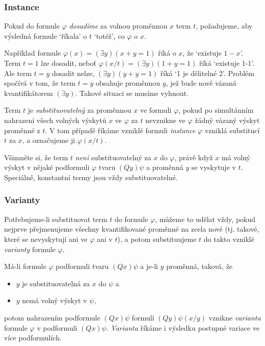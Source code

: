 \subsubsection{Instance}

Pokud do formule $\varphi$ \emph{dosadíme} za volnou proměnnou $x$ term $t$, požadujeme, aby výsledná formule `říkala' o $t$ `totéž', co $\varphi$ o $x$. 

\begin{example}
    Například formule $\varphi(x)=(\exists y)(x+y=1)$ říká o $x$, že `existuje $1-x$'. Term $t=1$ lze dosadit, neboť $\varphi(x/t)=(\exists y)(1+y=1)$ říká `existuje 1-1'. Ale term $t=y$ dosadit nelze, $(\exists y)(y+y=1)$ říká `1 je dělitelné 2'. Problém spočívá v tom, že term $t=y$ obsahuje proměnnou $y$, jež bude nově vázaná kvantifikátorem $(\exists y)$. Takové situaci se musíme vyhnout.
\end{example}

\begin{definition}
    Term $t$ je \emph{substituovatelný} za proměnnou $x$ ve formuli $\varphi$, pokud po simultánním nahrazení všech volných výskytů $x$ ve $\varphi$ za $t$ nevznikne ve $\varphi$ žádný vázaný výskyt proměnné z $t$. V tom případě říkáme vzniklé formuli \emph{instance} $\varphi$ vzniklá substitucí $t$ za $x$, a označujeme ji $\varphi(x/t)$.
\end{definition}

\begin{remark}
    Všimněte si, že term $t$ \emph{není} substituovatelný za $x$ do $\varphi$, právě když $x$ má volný výskyt v nějaké podformuli $\varphi$ tvaru $(Qy)\psi$ a proměnná $y$ se vyskytuje v $t$. Speciálně, konstantní termy jsou vždy substituovatelné.    
\end{remark}

\subsubsection{Varianty}

Potřebujeme-li substituovat term $t$ do formule $\varphi$, můžeme to udělat vždy, pokud nejprve přejmenujeme všechny kvantifikované proměnné na zcela nové (tj. takové, které se nevyskytují ani ve $\varphi$ ani v $t$), a potom substituujeme $t$ do takto vzniklé \emph{varianty} formule $\varphi$.

\begin{definition}[Varianta]
   Má-li formule $\varphi$ podformuli tvaru $(Qx)\psi$ a je-li $y$ proměnná, taková, že
   \begin{itemize}
    \item $y$ je substituovatelná za $x$ do $\psi$ a
    \item $y$ nemá volný výskyt v $\psi$,
   \end{itemize} 
potom nahrazením podformule $(Qx)\psi$ formulí $(Qy)\psi(x/y)$ vznikne \emph{varianta} formule $\varphi$ v podformuli $(Qx)\psi$. \emph{Varianta} říkáme i výsledku postupné variace ve více podformulích.
\end{definition}

